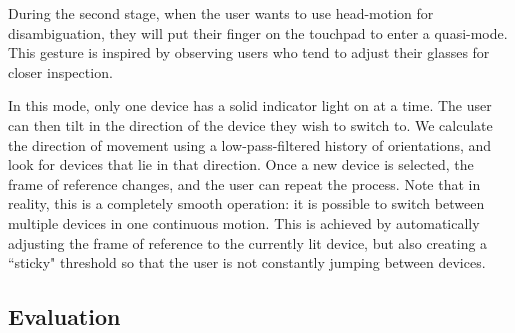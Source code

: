During the second stage, when the user wants to use head-motion for disambiguation, they will put their finger on the touchpad to enter a quasi-mode.  This gesture is inspired by observing users who tend to adjust their glasses for closer inspection.

In this mode, only one device has a solid indicator light on at a time.   The user can then tilt in the direction of the device they wish to switch to. We calculate the direction of movement using a low-pass-filtered history of orientations, and look for devices that lie in that direction. Once a new device is selected, the frame of reference changes, and the user can repeat the process. Note that in reality, this is a completely smooth operation: it is possible to switch between multiple devices in one continuous motion. This is achieved by automatically adjusting the frame of reference to the currently lit device, but also creating a ``sticky" threshold so that the user is not constantly jumping between devices. 




\subsection{Evaluation}



